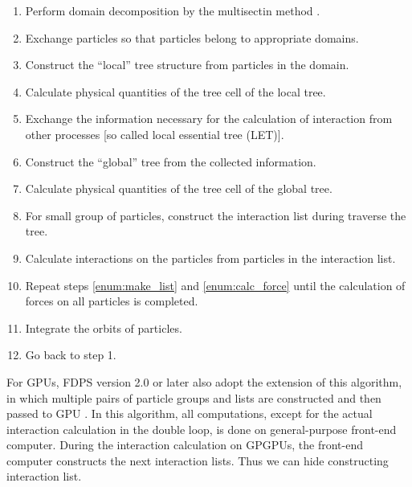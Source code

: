 \documentclass[]{pasj01}
\begin{document}
\begin{enumerate}

\item Perform domain decomposition by the multisectin method
  \citep{2004PASJ...56..521M}.
  
\item Exchange particles so that particles belong to appropriate
  domains.
  
\item Construct the ``local'' tree structure from particles in the
  domain.

\item Calculate physical quantities of the tree cell of the local tree.

\item Exchange the information necessary for the calculation of
  interaction from other processes [so called local essential tree
    (LET)].
  
\item Construct the ``global'' tree from the collected information.

\item Calculate physical quantities of the tree cell of the global tree.

\item For small group of particles, construct the interaction list
  during traverse the tree. \label{enum:make_list}
  
\item Calculate interactions on the particles from particles in the
  interaction list. \label{enum:calc_force}

\item Repeat steps \ref{enum:make_list} and \ref{enum:calc_force}
  until the calculation of forces on all particles is completed.
  
\item Integrate the orbits of particles.

\item Go back to step 1.
  
\end{enumerate}

For GPUs, FDPS version 2.0 or later also adopt the extension of this
algorithm, in which multiple pairs of particle groups and lists are
constructed and then passed to GPU \citep{Hamadaetal2009}. In this
algorithm, all computations, except for the actual interaction
calculation in the double loop, is done on general-purpose front-end
computer. During the interaction calculation on GPGPUs, the front-end
computer constructs the next interaction lists. Thus we can hide
constructing interaction list.
\end{document}
